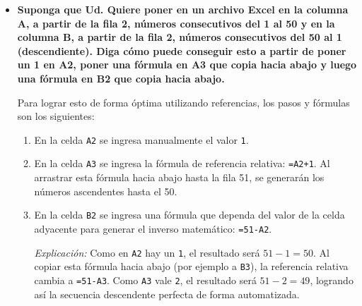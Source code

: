 \documentclass[11pt]{article}
\begin{document}
\begin{itemize}
    \begin{enumerate}
        \item \textbf{Color de Relleno (Fondo):} Se selecciona la celda, se navega a la barra de herramientas en la pestaña \textit{Inicio} (o formato) y se hace clic en el ícono del "balde de pintura" para seleccionar un color de fondo.
        \item \textbf{Estilo de Fuente (Negrita/Cursiva):} Se selecciona la celda y, en la misma barra de \textit{Inicio}, se hace clic en el botón \textbf{N} (Negrita) o \textit{K} (Cursiva), o utilizando los atajos de teclado \texttt{Ctrl+N} / \texttt{Ctrl+I}.
    \end{enumerate}

    \vspace{0.3cm}
    \item[\textbf{e)}] \textbf{Suponga que Ud. Quiere poner en un archivo Excel en la columna A, a partir de la fila 2, números consecutivos del 1 al 50 y en la columna B, a partir de la fila 2, números consecutivos del 50 al 1 (descendiente). Diga cómo puede conseguir esto a partir de poner un 1 en A2, poner una fórmula en A3 que copia hacia abajo y luego una fórmula en B2 que copia hacia abajo.}
    
    Para lograr esto de forma óptima utilizando referencias, los pasos y fórmulas son los siguientes:
    \begin{enumerate}
        \item En la celda \texttt{A2} se ingresa manualmente el valor \texttt{1}.
        \item En la celda \texttt{A3} se ingresa la fórmula de referencia relativa: \texttt{=A2+1}. Al arrastrar esta fórmula hacia abajo hasta la fila 51, se generarán los números ascendentes hasta el 50.
        \item En la celda \texttt{B2} se ingresa una fórmula que dependa del valor de la celda adyacente para generar el inverso matemático: \texttt{=51-A2}. 
        
        \textit{Explicación:} Como en \texttt{A2} hay un \texttt{1}, el resultado será $51 - 1 = 50$. Al copiar esta fórmula hacia abajo (por ejemplo a \texttt{B3}), la referencia relativa cambia a \texttt{=51-A3}. Como \texttt{A3} vale \texttt{2}, el resultado será $51 - 2 = 49$, logrando así la secuencia descendente perfecta de forma automatizada.
    \end{enumerate}

\end{itemize}
\end{document}

